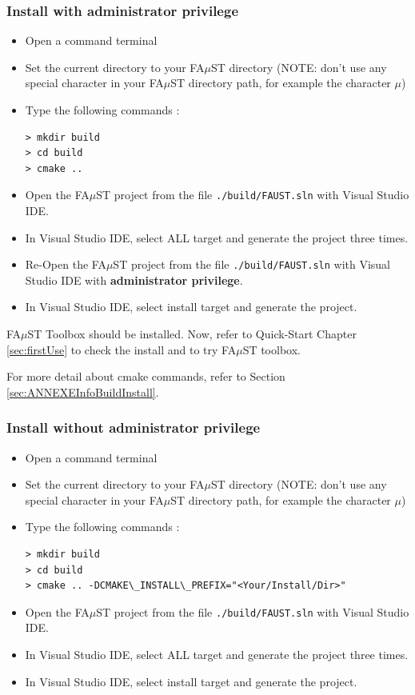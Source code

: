 \subsubsection{Install with administrator privilege}
\label{sec:AdminWinVisualStudioBasicInstall}
\begin{itemize}
\item Open a command terminal
\item Set the current directory to your FA$\mu$ST directory (NOTE: don't use any special character in your FA$\mu$ST directory path, for example the character $\mu$)
\item Type the following commands : 
\begin{lstlisting}
> mkdir build
> cd build
> cmake .. 
\end{lstlisting}
\item Open the FA$\mu$ST project from the file \texttt{./build/FAUST.sln} with Visual Studio IDE.
\item In Visual Studio IDE, select ALL target and generate the project three times.
\item Re-Open the FA$\mu$ST project from the file \texttt{./build/FAUST.sln} with Visual Studio IDE with \textbf{administrator privilege}.
\item In Visual Studio IDE, select install target and generate the project.
\end{itemize}

FA$\mu$ST Toolbox should be installed. Now, refer to Quick-Start Chapter \ref{sec:firstUse} to check the install and to try FA$\mu$ST toolbox.

For more detail about cmake commands, refer to Section \ref{sec:ANNEXEInfoBuildInstall}.

 
\subsubsection{Install without administrator privilege}
\label{sec:NoAdminWinVisualStudioBasicInstall}

\begin{itemize}

\item Open a command terminal
\item Set the current directory to your FA$\mu$ST directory (NOTE: don't use any special character in your FA$\mu$ST directory path, for example the character $\mu$)
\item Type the following commands : 
\begin{lstlisting}
> mkdir build
> cd build
> cmake .. -DCMAKE\_INSTALL\_PREFIX="<Your/Install/Dir>"
\end{lstlisting}
\item Open the FA$\mu$ST project from the file \texttt{./build/FAUST.sln} with Visual Studio IDE.
\item In Visual Studio IDE, select ALL target and generate the project three times.
\item In Visual Studio IDE, select install target and generate the project.
\end{itemize}

